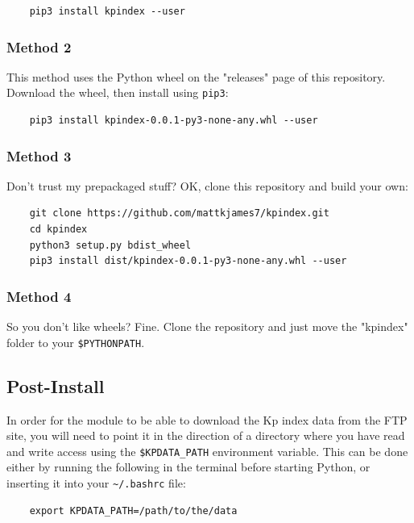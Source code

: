 	\begin{verbatim}
	pip3 install kpindex --user
	\end{verbatim}
	
	\subsubsection{Method 2}
	
	This method uses the Python wheel on the "releases" page of this 
	repository. Download the wheel, then install using \texttt{pip3}:
	
	\begin{verbatim}
	pip3 install kpindex-0.0.1-py3-none-any.whl --user
	\end{verbatim}
	
	\subsubsection{Method 3}
	
	Don't trust my prepackaged stuff? OK, clone this repository and build
	your own:
	
	\begin{verbatim}
	git clone https://github.com/mattkjames7/kpindex.git
	cd kpindex
	python3 setup.py bdist_wheel
	pip3 install dist/kpindex-0.0.1-py3-none-any.whl --user
	\end{verbatim}
	
	\subsubsection{Method 4}
	
	So you don't like wheels? Fine. Clone the repository and just move the
	"kpindex" folder to your \texttt{\$PYTHONPATH}.
	
	\subsection{Post-Install}
	
	In order for the module to be able to download the Kp index data from
	the FTP site, you will need to point it in the direction of a directory
	where you have read and write access using the \texttt{\$KPDATA_PATH}
	environment variable. This can be done either by running the following
	in the terminal before starting Python, or inserting it into your 
	\texttt{\~{}/.bashrc} file:
	
	\begin{verbatim}
	export KPDATA_PATH=/path/to/the/data
	\end{verbatim}
	
